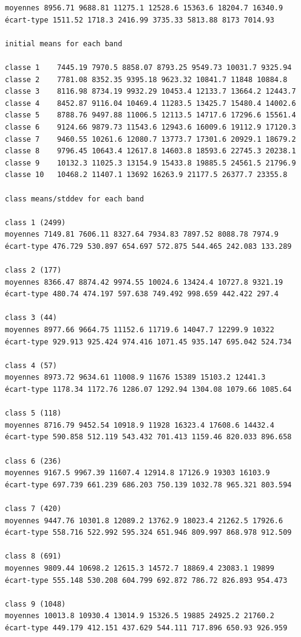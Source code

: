 \documentclass[earth,article,accept,pdftex,moreauthors]{Definitions/mdpi}
\begin{document}
{\begin{scriptsize}
\begin{verbatim}
moyennes 8956.71 9688.81 11275.1 12528.6 15363.6 18204.7 16340.9
écart-type 1511.52 1718.3 2416.99 3735.33 5813.88 8173 7014.93

initial means for each band

classe 1    7445.19 7970.5 8858.07 8793.25 9549.73 10031.7 9325.94
classe 2    7781.08 8352.35 9395.18 9623.32 10841.7 11848 10884.8
classe 3    8116.98 8734.19 9932.29 10453.4 12133.7 13664.2 12443.7
classe 4    8452.87 9116.04 10469.4 11283.5 13425.7 15480.4 14002.6
classe 5    8788.76 9497.88 11006.5 12113.5 14717.6 17296.6 15561.4
classe 6    9124.66 9879.73 11543.6 12943.6 16009.6 19112.9 17120.3
classe 7    9460.55 10261.6 12080.7 13773.7 17301.6 20929.1 18679.2
classe 8    9796.45 10643.4 12617.8 14603.8 18593.6 22745.3 20238.1
classe 9    10132.3 11025.3 13154.9 15433.8 19885.5 24561.5 21796.9
classe 10   10468.2 11407.1 13692 16263.9 21177.5 26377.7 23355.8

class means/stddev for each band

class 1 (2499)
moyennes 7149.81 7606.11 8327.64 7934.83 7897.52 8088.78 7974.9
écart-type 476.729 530.897 654.697 572.875 544.465 242.083 133.289

class 2 (177)
moyennes 8366.47 8874.42 9974.55 10024.6 13424.4 10727.8 9321.19
écart-type 480.74 474.197 597.638 749.492 998.659 442.422 297.4

class 3 (44)
moyennes 8977.66 9664.75 11152.6 11719.6 14047.7 12299.9 10322
écart-type 929.913 925.424 974.416 1071.45 935.147 695.042 524.734

class 4 (57)
moyennes 8973.72 9634.61 11008.9 11676 15389 15103.2 12441.3
écart-type 1178.34 1172.76 1286.07 1292.94 1304.08 1079.66 1085.64

class 5 (118)
moyennes 8716.79 9452.54 10918.9 11928 16323.4 17608.6 14432.4
écart-type 590.858 512.119 543.432 701.413 1159.46 820.033 896.658

class 6 (236)
moyennes 9167.5 9967.39 11607.4 12914.8 17126.9 19303 16103.9
écart-type 697.739 661.239 686.203 750.139 1032.78 965.321 803.594

class 7 (420)
moyennes 9447.76 10301.8 12089.2 13762.9 18023.4 21262.5 17926.6
écart-type 558.716 522.992 595.324 651.946 809.997 868.978 912.509

class 8 (691)
moyennes 9809.44 10698.2 12615.3 14572.7 18869.4 23083.1 19899
écart-type 555.148 530.208 604.799 692.872 786.72 826.893 954.473

class 9 (1048)
moyennes 10013.8 10930.4 13014.9 15326.5 19885 24925.2 21760.2
écart-type 449.179 412.151 437.629 544.111 717.896 650.93 926.959


\end{verbatim}
\end{scriptsize}}
\end{document}
